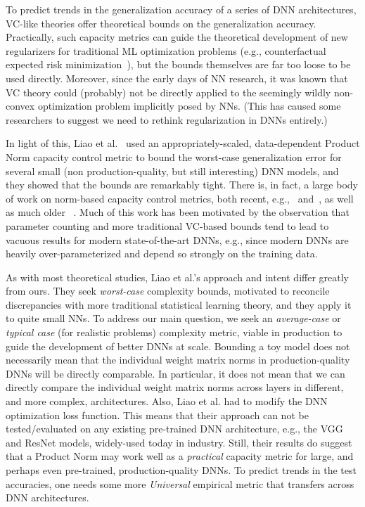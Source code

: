 To predict trends in the generalization accuracy of a series of DNN architectures, VC-like theories offer theoretical bounds on the generalization accuracy. 
Practically, such capacity metrics can guide the
theoretical development of new regularizers for traditional ML optimization problems (e.g., counterfactual expected risk minimization~\cite{JMLR:v16:swaminathan15a}), but the bounds themselves are far too loose to be used directly. 
Moreover, since the early days of NN research, 
it was known that 
VC theory could (probably) not be directly applied to the seemingly wildly non-convex optimization problem implicitly posed by NNs. 
(This has caused some researchers to suggest we need to rethink regularization in DNNs entirely.)

In light of this, 
Liao et al.~\cite{LMBx18_TR} used an appropriately-scaled, data-dependent Product Norm capacity control metric to bound the worst-case generalization error for several small (non production-quality, but still interesting) DNN models, and they showed that the bounds are remarkably tight.
%
There is, in fact, a large body of work on norm-based capacity control metrics, both recent, e.g.,~\cite{LMBx18_TR, SHNx17_TR,PLMx18_TR} and~\cite{NTS14_TR,NTS15,NBMS17_TR,BFT17_TR,YM17_TR,KKB17_TR,NBS17_TR,AGNZ18_TR,ACH18_TR,ZF18_TR}, as well as much older ~\cite{Bar97,MN09_TR}. 
Much of this work has been motivated by the observation that parameter counting and more traditional VC-based bounds tend to lead to 
vacuous results for modern state-of-the-art DNNs, e.g., since modern DNNs are heavily over-parameterized and depend so strongly on the training data.

As with most theoretical studies, Liao et al.'s approach and intent differ greatly from ours.
They seek \emph{worst-case} complexity bounds, motivated to reconcile discrepancies with more traditional statistical learning theory, and they apply it to quite small NNs.
To address our main question, we seek an \emph{average-case} or \emph{typical case} (for realistic problems) complexity metric, viable in production to guide the development of better DNNs at scale.
Bounding a toy model does not necessarily mean that the individual weight matrix norms in production-quality DNNs will be directly comparable.
In particular, it does not mean that we can directly compare the individual weight matrix norms across layers in different, and more complex, architectures. 
Also, 
Liao et al. had to modify the DNN optimization loss function.
This means that their approach can not be tested/evaluated on any existing pre-trained DNN architecture, e.g., the VGG and ResNet models, widely-used today in industry. 
Still, their results do suggest that a Product Norm may work well as a \emph{practical} capacity metric for large, and perhaps even pre-trained, production-quality DNNs.   
To predict trends in the test accuracies, one needs some more \emph{Universal} empirical metric that transfers across DNN architectures.

